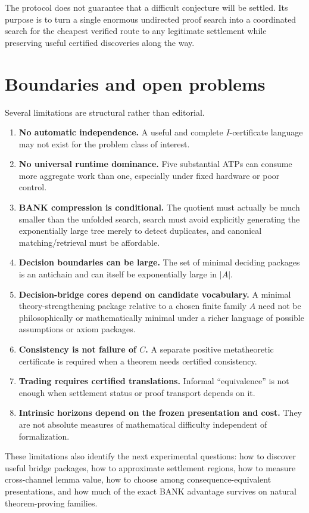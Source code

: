 \documentclass[11pt]{article}
\theoremstyle{remark}
\begin{document}
The protocol does not guarantee that a difficult conjecture will be settled. Its purpose is to turn a single enormous undirected proof search into a coordinated search for the cheapest verified route to any legitimate settlement while preserving useful certified discoveries along the way.

\section{Boundaries and open problems}

Several limitations are structural rather than editorial.

\begin{enumerate}
\item \textbf{No automatic independence.} A useful and complete $I$-certificate language may not exist for the problem class of interest.
\item \textbf{No universal runtime dominance.} Five substantial ATPs can consume more aggregate work than one, especially under fixed hardware or poor control.
\item \textbf{BANK compression is conditional.} The quotient must actually be much smaller than the unfolded search, search must avoid explicitly generating the exponentially large tree merely to detect duplicates, and canonical matching/retrieval must be affordable.
\item \textbf{Decision boundaries can be large.} The set of minimal deciding packages is an antichain and can itself be exponentially large in $|A|$.
\item \textbf{Decision-bridge cores depend on candidate vocabulary.} A minimal theory-strengthening package relative to a chosen finite family $A$ need not be philosophically or mathematically minimal under a richer language of possible assumptions or axiom packages.
\item \textbf{Consistency is not failure of $C$.} A separate positive metatheoretic certificate is required when a theorem needs certified consistency.
\item \textbf{Trading requires certified translations.} Informal ``equivalence'' is not enough when settlement status or proof transport depends on it.
\item \textbf{Intrinsic horizons depend on the frozen presentation and cost.} They are not absolute measures of mathematical difficulty independent of formalization.
\end{enumerate}

These limitations also identify the next experimental questions: how to discover useful bridge packages, how to approximate settlement regions, how to measure cross-channel lemma value, how to choose among consequence-equivalent presentations, and how much of the exact BANK advantage survives on natural theorem-proving families.
\end{document}
